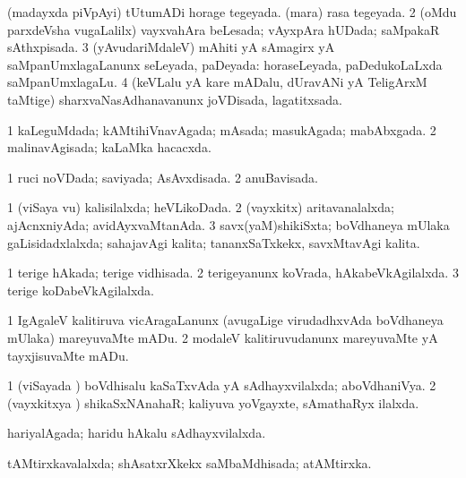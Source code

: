 \bentry
{} 
\gl{\gu}
\expl{}
\bmng
\bnum
{}
\banum
{} (madayxda piVpAyi) tUtumADi horage tegeyada. 
 (mara) rasa tegeyada. 
\eanum
\numie
\num{2} (oMdu parxdeVsha \mo vugaLalilx) vayxvahAra beLesada; vAyxpAra hUDada; saMpakaR sAthxpisada. 
\num{3} (yAvudariMdaleV) mAhiti yA sAmagirx yA saMpanUmxlagaLanunx seLeyada, paDeyada:  horaseLeyada, paDedukoLaLxda saMpanUmxlagaLu. 
\num{4} (keVLalu yA kare mADalu, dUravANi yA TeligArxM taMtige) sharxvaNasAdhanavanunx joVDisada, lagatitxsada. 
\enum
\emng
\eentry

\bentry
{} 
\gl{\gu}
\expl{}
\bmng
\bnum
\num{1} kaLeguMdada; kAMtihiVnavAgada; mAsada; masukAgada; mabAbxgada. 
\num{2} malinavAgisada; kaLaMka hacacxda. 
\enum
\emng
\eentry

\bentry
{} 
\gl{\gu}
\expl{}
\bmng
\bnum
\num{1} ruci noVDada; saviyada; AsAvxdisada. 
\num{2} anuBavisada. 
\enum
\emng
\eentry

\bentry
{} 
\gl{\gu}
\expl{}
\bmng
\bnum
\num{1} (viSaya \mo vu) kalisilalxda; heVLikoDada. 
\num{2} (vayxkitx) aritavanalalxda; ajAcnxniyAda; avidAyxvaMtanAda. 
\num{3} savx(yaM)shikiSxta; boVdhaneya mUlaka gaLisidadxlalxda; sahajavAgi kalita; tananxSaTxkekx, savxMtavAgi kalita. 
\enum
\emng
\eentry

\bentry
{} 
\gl{\gu}
\expl{}
\bmng
\bnum
\num{1} terige hAkada; terige vidhisada. 
\num{2} terigeyanunx koVrada, hAkabeVkAgilalxda. 
\num{3} terige koDabeVkAgilalxda. 
\enum
\emng
\eentry

\bentry
{} 
\gl{\sakirx}
\bmng
\bnum
\num{1} IgAgaleV kalitiruva vicAragaLanunx (avugaLige virudadhxvAda boVdhaneya mUlaka) mareyuvaMte mADu. 
\num{2} modaleV kalitiruvudanunx mareyuvaMte yA tayxjisuvaMte mADu. 
\enum
\emng
\eentry

\bentry
{} 
\gl{\gu}
\expl{}
\bmng
\bnum
\num{1} (viSayada \vi) boVdhisalu kaSaTxvAda yA sAdhayxvilalxda; aboVdhaniVya. 
\num{2} (vayxkitxya \vi) shikaSxNAnahaR; kaliyuva yoVgayxte, sAmathaRyx ilalxda. 
\enum
\emng
\eentry

\bentry
{} 
\gl{\gu}
\expl{}
\bmng
hariyalAgada; haridu hAkalu sAdhayxvilalxda. 
\emng
\eentry

\bentry
{} 
\gl{\gu}
\expl{}
\bmng
tAMtirxkavalalxda; shAsatxrXkekx saMbaMdhisada; atAMtirxka. 
\emng
\eentry

